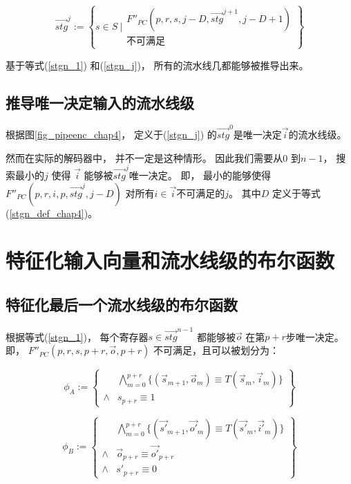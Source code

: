 \begin{equation}\label{stgn_j}
\vec{stg}^{j} :=
 \left\{
 s\in S ~|
\begin{array}{cc}
 F''_{PC}(p,r,s,j-D,\vec{stg}^{j+1},j-D+1)\\
不可满足
\end{array}
\right\}
\end{equation}

基于等式(\ref{stgn_1}) 和(\ref{stgn_j})，
所有的流水线几都能够被推导出来。

\subsection{推导唯一决定输入的流水线级}\label{subsec_inferinput}

根据图\ref{fig_pipeenc_chap4}，
 定义于(\ref{stgn_j}) 的$\vec{stg}^0$是唯一决定$\vec{i}$的流水线级。

然而在实际的解码器中，
并不一定是这种情形。
因此我们需要从$0$ 到$n-1$，
搜索最小的$j$ 使得
$\vec{i}$ 能够被$\vec{stg}^j$唯一决定。
即，
最小的能够使得$F''_{PC}(p,r,i,p,\vec{stg}^{j},j-D)$ 对所有$i\in \vec{i}$不可满足的$j$。
其中$D$ 定义于等式(\ref{stgn_def_chap4})。

\section{特征化输入向量和流水线级的布尔函数}\label{sec_char_chap4}
\subsection{特征化最后一个流水线级的布尔函数}

根据等式(\ref{stgn_1})，
每个寄存器$s\in \vec{stg}^{n-1}$ 都能够被$\vec{o}$ 在第$p+r$步唯一决定。
即，
$F''_{PC}(p,r,s,p+r,\vec{o},p+r)$ 不可满足，且可以被划分为：

\begin{equation}
 \phi_A :=
 \left\{
\begin{array}{cc}
&\bigwedge_{m=0}^{p+r}
\{
(\vec{s}_{m+1},\vec{o}_m)\equiv T(\vec{s}_m,\vec{i}_m)
\}
\\
\wedge& s_{p+r}\equiv 1
\end{array}
\right\}
\end{equation}

\begin{equation}
\phi_B :=
\left\{
\begin{array}{cc}
&\bigwedge_{m=0}^{p+r}
\{
(\vec{s'}_{m+1},\vec{o'}_m)\equiv T(\vec{s'}_m,\vec{i'}_m)
\}
\\
\wedge&\vec{o}_{p+r}\equiv \vec{o'}_{p+r} \\
\wedge& s'_{p+r}\equiv 0
\end{array}
\right\}
\end{equation}

